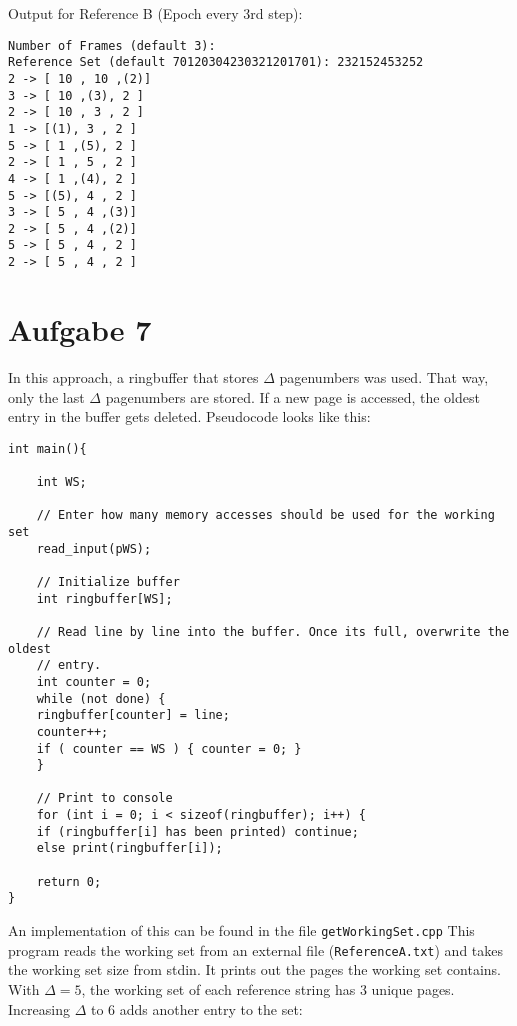 \documentclass{article}
\begin{document}
Output for Reference B (Epoch every 3rd step):
\begin{lstlisting}
Number of Frames (default 3): 
Reference Set (default 70120304230321201701): 232152453252
2 -> [ 10 , 10 ,(2)]
3 -> [ 10 ,(3), 2 ]
2 -> [ 10 , 3 , 2 ]
1 -> [(1), 3 , 2 ]
5 -> [ 1 ,(5), 2 ]
2 -> [ 1 , 5 , 2 ]
4 -> [ 1 ,(4), 2 ]
5 -> [(5), 4 , 2 ]
3 -> [ 5 , 4 ,(3)]
2 -> [ 5 , 4 ,(2)]
5 -> [ 5 , 4 , 2 ]
2 -> [ 5 , 4 , 2 ]
\end{lstlisting}

\section*{Aufgabe 7}
In this approach, a ringbuffer that stores \( \Delta \) pagenumbers was used.
That way, only the last \( \Delta \) pagenumbers are stored. If a new page is
accessed, the oldest entry in the buffer gets deleted. Pseudocode looks like this:
\begin{lstlisting}
int main(){

    int WS;

    // Enter how many memory accesses should be used for the working set
    read_input(pWS);

    // Initialize buffer
    int ringbuffer[WS];

    // Read line by line into the buffer. Once its full, overwrite the oldest
    // entry.
    int counter = 0;
    while (not done) {
	ringbuffer[counter] = line;
	counter++;
	if ( counter == WS ) { counter = 0; }
    }

    // Print to console
    for (int i = 0; i < sizeof(ringbuffer); i++) {
	if (ringbuffer[i] has been printed) continue;
	else print(ringbuffer[i]);

    return 0;
}

\end{lstlisting}

An implementation of this can be found in the file \texttt{getWorkingSet.cpp}
This program reads the working set from an external file (\texttt{ReferenceA.txt}) and
takes the working set size from stdin. It prints out the pages
the working set contains. With \( \Delta = 5 \), the working set of each
reference string has 3 unique pages. Increasing \( \Delta \) to 6 adds
another entry to the set:\\[.5cm]
\end{document}
